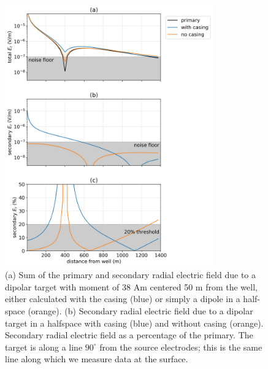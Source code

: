 \begin{figure}
    \begin{center}
    \includegraphics[width=0.8\textwidth]{figures/dc_casing/detectability_dipole.png}
    \end{center}
\caption{
    (a) Sum of the primary and secondary radial electric field due to a dipolar
    target with moment of 38 Am
    centered 50 m from the well, either calculated with the
    casing (blue) or simply a dipole in a half-space (orange). (b) Secondary
    radial electric field due to a dipolar target in a halfspace with casing (blue) and without casing (orange).
    Secondary radial electric field as a percentage of the primary.
    The target is along a line $90^\circ$ from the
    source electrodes; this is the same line along which we measure data at the surface.
}
\label{fig:detectability_dipole}
\end{figure}
